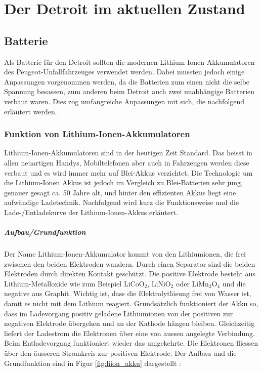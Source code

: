 \chapter{Der Detroit im aktuellen Zustand}

\section{Batterie}
Als Batterie für den Detroit sollten die modernen Lithium-Ionen-Akkumulatoren des Peugeot-Unfallfahrzeuges verwendet werden. Dabei mussten jedoch einige Anpassungen vorgenommen werden, da die Batterien zum einen nicht die selbe Spannung besassen, zum anderen beim Detroit auch zwei unabhängige Batterien verbaut waren. Dies zog umfangreiche Anpassungen mit sich, die nachfolgend erläutert werden.

\subsection{Funktion von Lithium-Ionen-Akkumulatoren} \label{kap_liion}

Lithium-Ionen-Akkumulatoren sind in der heutigen Zeit Standard. Das heisst in allen neuartigen Handys, Mobiltelefonen aber auch in Fahrzeugen werden diese verbaut und es wird immer mehr auf Blei-Akkus verzichtet. Die Technologie um die Lithium-Ionen Akkus ist jedoch im Vergleich zu Blei-Batterien sehr jung, genauer gesagt ca. 50 Jahre alt, und hinter den effizienten Akkus liegt eine aufwändige Ladetechnik. Nachfolgend wird kurz die Funktionsweise und die Lade-/Entladekurve der Lithium-Ionen-Akkus erläutert.

\paragraph{Aufbau/Grundfunktion}
Der Name Lithium-Ionen-Akkumulator kommt von den Lithiumionen, die frei zwischen den beiden Elektroden wandern. Durch einen Separator sind die beiden Elektroden durch direkten Kontakt geschützt. Die positive Elektrode besteht aus Lithium-Metalloxide wie zum Beispiel LiCoO$_2$, LiNiO$_2$ oder LiMn$_2$O$_4$ und die negative aus Graphit. Wichtig ist, dass die Elektrolytlösung frei von Wasser ist, damit es nicht mit dem Lithium reagiert.
Grundsätzlich funktioniert der Akku so, dass im Ladevorgang positiv geladene Lithiumionen von der positiven zur negativen Elektrode übergehen und an der Kathode hängen bleiben. Gleichzeitig liefert der Ladestrom die Elektronen über eine von aussen angelegte Verbindung. Beim Entladevorgang funktioniert wieder das umgekehrte. Die Elektronen fliessen über den äusseren Stromkreis zur positiven Elektrode. Der Aufbau und die Grundfunktion sind in Figur \ref{fig:liion_akku} dargestellt \cite{liion_akku_aufbau_funktion2}:

